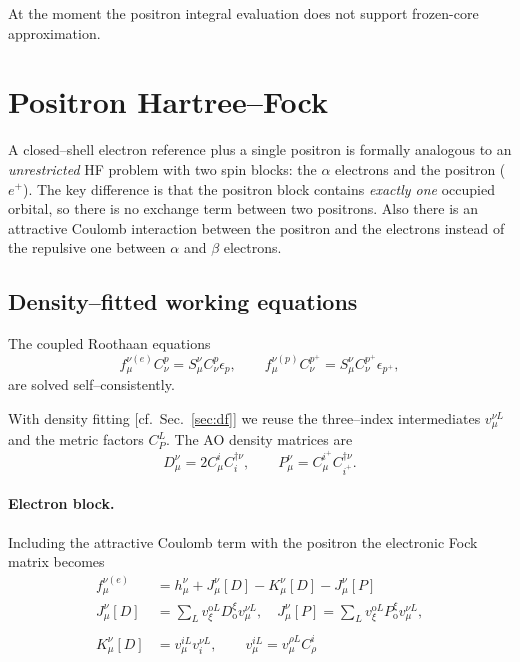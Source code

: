 \documentclass[a4paper,12pt,oneside]{book}
\newcommand{\sect}[1]{Sec.~\ref{#1}}
\newcommand{\pos}[1]{{#1}^{+}}
\begin{document}
At the moment the positron integral evaluation does not support frozen-core approximation. 

\section{Positron Hartree--Fock}
\label{sec:positron-hf}

A closed--shell electron reference plus a single positron is formally
analogous to an \textit{unrestricted} HF problem with two spin blocks:
the $\alpha$ electrons and the positron ($e^+$). The key
difference is that the positron block contains \emph{exactly one}
occupied orbital, so there is no exchange term between two positrons.
Also there is an attractive Coulomb interaction between the positron and the
electrons instead of the repulsive one between $\alpha$ and $\beta$ electrons.  

\subsection{Density--fitted working equations}
The coupled Roothaan equations
\begin{equation}
f_{\mu}^{\nu(e)} C_{\nu}^{p} = S_{\mu}^{\nu} C_{\nu}^{p} \epsilon_{p},\qquad
f_{\mu}^{\nu(p)} C_{\nu}^{\pos{p}} = S_{\mu}^{\nu} C_{\nu}^{\pos{p}} \epsilon_{\pos{p}},
\label{eq:poshf-roothaan}
\end{equation}
are solved self--consistently.

With density fitting [cf.~\sect{sec:df}] we reuse the three--index
intermediates $v_{\mu}^{\nu L}$ and the metric factors $C_{P}^{L}$. The
AO density matrices are
\begin{equation}
D_{\mu}^{\nu} = 2 C_{\mu}^{i} C^{\dagger\nu}_{i},\qquad
P_{\mu}^{\nu} = C_{\mu}^{\pos{i}} C^{\dagger\nu}_{\pos{i}}.
\end{equation}

\paragraph{Electron block.}  Including the attractive Coulomb term with
the positron the electronic Fock matrix becomes
\begin{equation}
\begin{aligned}
f_{\mu}^{\nu(e)} &= h_{\mu}^{\nu}
+ J_{\mu}^{\nu}[D] - K_{\mu}^{\nu}[D]
 -     J_{\mu}^{\nu}[P] \\
 J_{\mu}^{\nu}[D] &= \sum_{L} v_{\xi}^{\text{o}L} D_{\text{o}}^{\xi} v_{\mu}^{\nu L},
 \quad J_{\mu}^{\nu}[P] = \sum_{L} v_{\xi}^{\text{o}L} P_{\text{o}}^{\xi} v_{\mu}^{\nu L},\\
 \\
K_{\mu}^{\nu}[D] &= v_{\mu}^{iL} v_{i}^{\nu L},\qquad 
v_{\mu}^{iL} = v_{\mu}^{\rho L} C_{\rho}^{i}
\label{eq:poshf-fock-e}
\end{aligned}
\end{equation}
\end{document}
